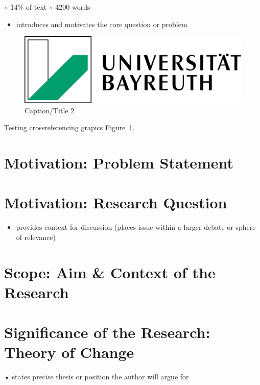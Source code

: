 \documentclass[
  letterpaper,
]{book}
\providecommand{\tightlist}{%
  \setlength{\itemsep}{0pt}\setlength{\parskip}{0pt}}
\begin{document}
\textasciitilde{} 14\% of text \textasciitilde{} 4200 words

\begin{itemize}
\tightlist
\item
  introduces and motivates the core question or problem
\end{itemize}

\begin{figure}

\includegraphics[width=0.3\linewidth,height=\textheight,keepaspectratio]{images/cover.png}

\caption[Short 2 caption]{\label{fig-testgraphic2}Caption/Title 2}

\end{figure}%

Testing crossreferencing grapics Figure~\ref{fig-testgraphic2}.

\section{Motivation: Problem
Statement}\label{motivation-problem-statement}

\section{Motivation: Research
Question}\label{motivation-research-question}

\begin{itemize}
\tightlist
\item
  provides context for discussion (places issue within a larger debate
  or sphere of relevance)
\end{itemize}

\section{Scope: Aim \& Context of the
Research}\label{scope-aim-context-of-the-research}

\section{Significance of the Research: Theory of
Change}\label{significance-of-the-research-theory-of-change}

• states precise thesis or position the author will argue for
\end{document}
